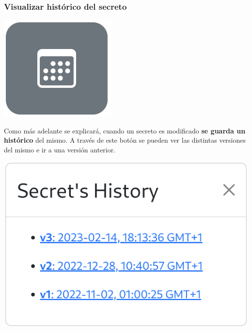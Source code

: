 \documentclass{\ClassPath/viu-tfm-template}
\begin{document}
\subsubsection*{Visualizar histórico del secreto}
{
\begin{minipage}{0.1\linewidth}
    \includegraphics[width=\linewidth]{img/calendar.png}
\end{minipage}
\hspace{0.5cm}
\begin{minipage}{0.9\linewidth}
    Como más adelante se explicará, cuando un secreto es modificado \textbf{se guarda un histórico} del mismo. A través de este botón se pueden ver las distintas versiones del mismo e ir a una versión anterior.
\end{minipage}
}
\vspace{-8pt}
\begin{center}
    \includegraphics[width=0.56\linewidth]{img/history.png}
\end{center}
\end{document}
